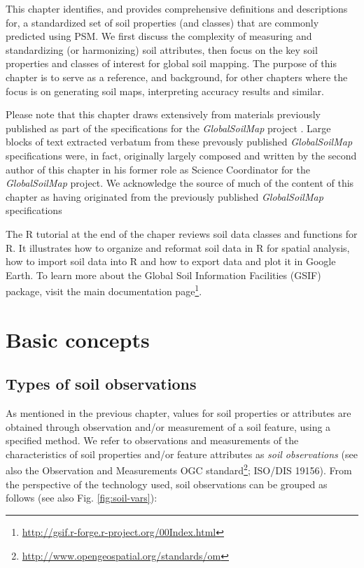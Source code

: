 \documentclass[graybox,natbib,nospthms,UStrade]{svmono}
\renewcommand{\href}[2]{#2 (\url{#1})}
\renewcommand{\href}[2]{#2\footnote{\url{#1}}}
\begin{document}
This chapter identifies, and provides comprehensive definitions and
descriptions for, a standardized set of soil properties (and classes) that are
commonly predicted using PSM. We first discuss the complexity of measuring and standardizing (or harmonizing) soil attributes, then focus on the key soil properties and classes of interest for global soil
mapping. The purpose of this chapter is to serve as a reference, and background, for other
chapters where the focus is on generating soil maps, interpreting
accuracy results and similar.

Please note that this chapter draws extensively from materials previously
published as part of the specifications for the \emph{GlobalSoilMap} project \citep{Arrouays201493}.
Large blocks of text extracted verbatum from these prevously published
\emph{GlobalSoilMap} specifications were, in fact, originally largely composed
and written by the second author of this chapter in his former role as
Science Coordinator for the \emph{GlobalSoilMap} project. We acknowledge the source of much of
the content of this chapter as having originated from the previously published \emph{GlobalSoilMap}
specifications

The R tutorial at the end of the chaper reviews soil data classes and
functions for R. It illustrates how to organize and reformat soil data in R for spatial analysis,
how to import soil data into R and how to export data and plot it in Google Earth.
To learn more about the Global Soil Information Facilities (GSIF) package,
visit the main \href{http://gsif.r-forge.r-project.org/00Index.html}{documentation page}.

\hypertarget{basic-concepts-1}{%
\section{Basic concepts}\label{basic-concepts-1}}

\hypertarget{types-of-soil-observations}{%
\subsection{Types of soil observations}\label{types-of-soil-observations}}

As mentioned in the previous chapter, values for soil properties or
attributes are obtained through observation and/or measurement of a soil
feature, using a specified method. We refer to observations and
measurements of the characteristics of soil properties and/or feature
attributes as \emph{soil observations} (see also the \href{http://www.opengeospatial.org/standards/om}{Observation and Measurements
OGC standard}; ISO/DIS 19156). From the perspective of the technology
used, soil observations can be grouped as follows (see also
Fig. \ref{fig:soil-vars}):
\end{document}
